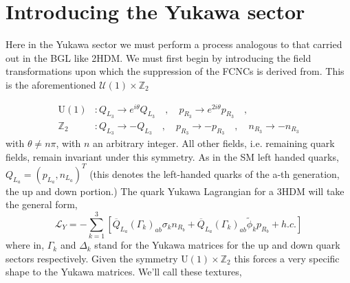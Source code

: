 \section{Introducing the Yukawa sector}

Here in the Yukawa sector we must perform a process analogous to that carried out in the BGL like 2HDM. We must first begin by introducing the field transformations upon which the suppression of the FCNCs is derived from. This is the aforementioned $\mathcal{U(1)}\times\mathbb{Z}_2$

\begin{equation}
\begin{split}
\mathrm{U(1)} & : Q_{L_3} \rightarrow e^{i \theta} Q_{L_3} \quad , \quad p_{R_3} \rightarrow e^{2 i \theta} p_{R_3} \quad , \\ 
\mathbb{Z}_2 & : Q_{L_3} \rightarrow -Q_{L_3} \quad , \quad p_{R_3} \rightarrow - p_{R_3} \quad , \quad n_{R_3} \rightarrow - n_{R_3}
\end{split}
\end{equation}
with $\theta \neq n \pi$, with $n$ an arbitrary integer. All other fields, i.e. remaining quark fields, remain invariant under this symmetry. As in the SM left handed quarks, $Q_{L_a}=\left( p_{L_a} , n_{L_a} \right)^T$ (this denotes the left-handed quarks of the a-th generation, the up and down portion.)
%
The quark Yukawa Lagrangian for a 3HDM will take the general form, 
\begin{equation}
\mathcal{L}_Y = - \sum_{k=1}^3 \left[ \overline{Q}_{L_a} \left( \Gamma_k \right)_{ab} \sigma_k n_{R_b} + \overline{Q}_{L_a} \left( \Gamma_k \right)_{ab} \tilde{\phi}_k p_{R_b} + h.c.  \right] 
\end{equation}   
where in, $\Gamma_k$ and $\Delta_k$ stand for the Yukawa matrices for the up and down quark sectors respectively. Given the symmetry $\mathrm{U}(1)\times\mathbb{Z}_2$ this forces a very specific shape to the Yukawa matrices. We'll call these textures,
